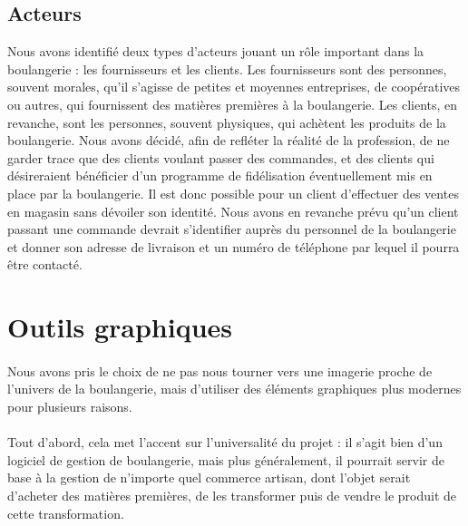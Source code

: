     \subsection{Acteurs}
        Nous avons identifié deux types d'acteurs jouant un rôle important dans
        la boulangerie : les fournisseurs et les clients.
        Les fournisseurs sont des personnes, souvent morales, qu'il s'agisse
        de petites et moyennes entreprises, de coopératives ou autres, qui
        fournissent des matières premières à la boulangerie.
        Les clients, en revanche, sont les personnes, souvent physiques, qui
        achètent les produits de la boulangerie.
        Nous avons décidé, afin de refléter la réalité de la profession, de 
        ne garder trace que des clients voulant passer des commandes, et des
        clients qui désireraient bénéficier d'un programme de fidélisation
        éventuellement mis en place par la boulangerie.
        Il est donc possible pour un client d'effectuer des ventes en magasin
        sans dévoiler son identité.
        Nous avons en revanche prévu qu'un client passant une commande devrait
        s'identifier auprès du personnel de la boulangerie et donner son
        adresse de livraison et un numéro de téléphone par lequel il pourra être
        contacté.



\section{Outils graphiques}
    \paragraph{}
        Nous avons pris le choix de ne pas nous tourner vers une imagerie
        proche de l'univers de la boulangerie, mais d'utiliser des éléments
        graphiques plus modernes pour plusieurs raisons.
    \paragraph{}
        Tout d'abord, cela met l'accent sur l'universalité du projet :
        il s'agit bien d'un logiciel de gestion de boulangerie, mais plus
        généralement, il pourrait servir de base à la gestion de n'importe
        quel commerce artisan, dont l'objet serait d'acheter des matières
        premières, de les transformer puis de vendre le produit de cette
        transformation.
